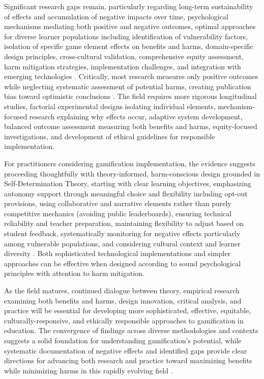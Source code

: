 \documentclass[12pt,a4paper]{article}
\begin{document}
Significant research gaps remain, particularly regarding long-term sustainability of effects and accumulation of negative impacts over time, psychological mechanisms mediating both positive and negative outcomes, optimal approaches for diverse learner populations including identification of vulnerability factors, isolation of specific game element effects on benefits and harms, domain-specific design principles, cross-cultural validation, comprehensive equity assessment, harm mitigation strategies, implementation challenges, and integration with emerging technologies \parencite{ryan2025,wu2024,dahri2024,ojonuba2023,wang2023,sevilla2024,surendeleg2024}. Critically, most research measures only positive outcomes while neglecting systematic assessment of potential harms, creating publication bias toward optimistic conclusions \parencite{surendeleg2024}. The field requires more rigorous longitudinal studies, factorial experimental designs isolating individual elements, mechanism-focused research explaining why effects occur, adaptive system development, balanced outcome assessment measuring both benefits and harms, equity-focused investigations, and development of ethical guidelines for responsible implementation.

For practitioners considering gamification implementation, the evidence suggests proceeding thoughtfully with theory-informed, harm-conscious design grounded in Self-Determination Theory, starting with clear learning objectives, emphasizing autonomy support through meaningful choice and flexibility including opt-out provisions, using collaborative and narrative elements rather than purely competitive mechanics (avoiding public leaderboards), ensuring technical reliability and teacher preparation, maintaining flexibility to adjust based on student feedback, systematically monitoring for negative effects particularly among vulnerable populations, and considering cultural context and learner diversity \parencite{ryan2025,rodriguez2025,toda2022,dahri2024,surendeleg2024}. Both sophisticated technological implementations \parencite{wang2023,rodriguez2025} and simpler approaches can be effective when designed according to sound psychological principles with attention to harm mitigation.

As the field matures, continued dialogue between theory, empirical research examining both benefits and harms, design innovation, critical analysis, and practice will be essential for developing more sophisticated, effective, equitable, culturally-responsive, and ethically responsible approaches to gamification in education. The convergence of findings across diverse methodologies and contexts suggests a solid foundation for understanding gamification's potential, while systematic documentation of negative effects and identified gaps provide clear directions for advancing both research and practice toward maximizing benefits while minimizing harms in this rapidly evolving field \parencite{ryan2025,wu2024,toda2022,dahri2024,sevilla2024,surendeleg2024}.
\end{document}
